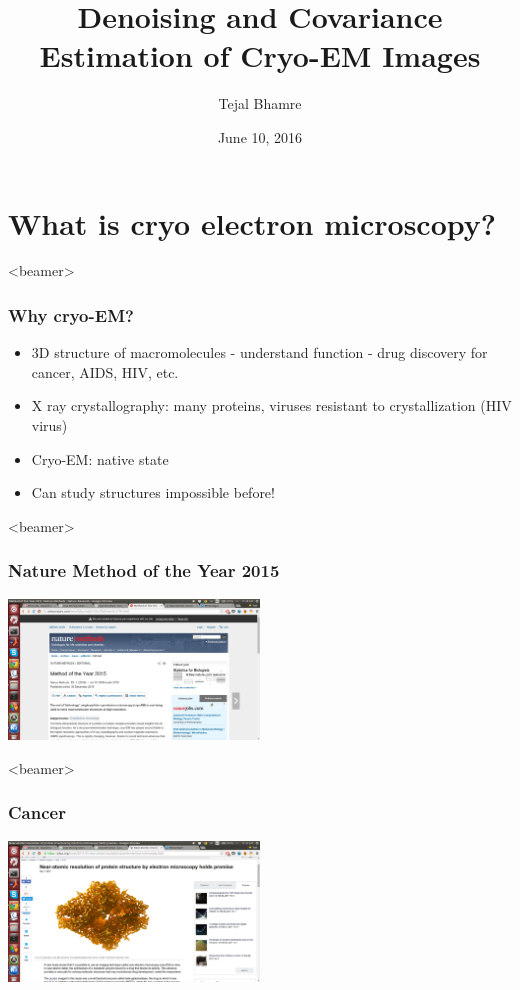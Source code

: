 \documentclass{beamer}
\begin{document}
\title{Denoising and Covariance Estimation of Cryo-EM Images} 
\date{June 10, 2016} 
\author{Tejal Bhamre\\
} 
\begin{frame}
\titlepage 
\end{frame}

% 
% 

\section{What is cryo electron microscopy?}

\begin{frame}<beamer>
\frametitle{Why cryo-EM?}

\begin{itemize}
 \item 3D structure of macromolecules - understand function - drug discovery for cancer, AIDS, HIV, etc.
 \item X ray crystallography: many proteins, viruses resistant to crystallization (HIV virus)
 \item Cryo-EM: native state
 \item Can study structures impossible before!
\end{itemize}
\end{frame}

\begin{frame}<beamer>
\frametitle{Nature Method of the Year 2015}
\includegraphics[width=0.5\textwidth]{nature.png}%
\end{frame}

\begin{frame}<beamer>
\frametitle{Cancer}
\includegraphics[width=0.5\textwidth]{cancer.png}%
\end{frame}
\end{document}

